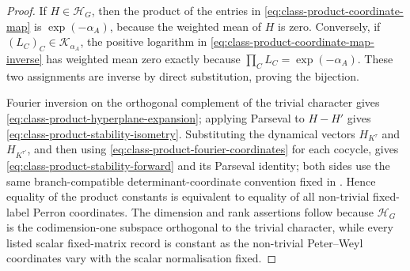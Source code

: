 \documentclass[11pt,a4paper]{amsart}
\theoremstyle{plain}
\theoremstyle{definition}
\theoremstyle{remark}
\begin{document}
\begin{proof}
  If \(H\in\mathcal H_G\), then the product of the entries in
  \eqref{eq:class-product-coordinate-map} is \(\exp(-\alpha_A)\), because the
  weighted mean of \(H\) is zero.  Conversely, if
  \((L_C)_C\in\mathscr K_{\alpha_A}\), the positive logarithm in
  \eqref{eq:class-product-coordinate-map-inverse} has weighted mean zero
  exactly because \(\prod_C L_C=\exp(-\alpha_A)\).  These two assignments are
  inverse by direct substitution, proving the bijection.

  Fourier inversion on the orthogonal complement of the trivial character gives
  \eqref{eq:class-product-hyperplane-expansion}; applying Parseval to
  \(H-H'\) gives \eqref{eq:class-product-stability-isometry}.  Substituting
  the dynamical vectors \(H_{K^\tau}\) and \(H_{K^{\tau'}}\), and then using
  \eqref{eq:class-product-fourier-coordinates} for each cocycle, gives
  \eqref{eq:class-product-stability-forward} and its Parseval identity; both
  sides use the same branch-compatible determinant-coordinate convention
  fixed in .
  Hence equality of the product constants is equivalent to equality of all
  non-trivial fixed-label Perron coordinates.  The dimension and rank
  assertions follow because \(\mathcal H_G\) is the codimension-one subspace
  orthogonal to the trivial character, while every listed scalar fixed-matrix
  record is constant as the non-trivial Peter--Weyl coordinates vary with the
  scalar normalisation fixed.
\end{proof}
\end{document}
